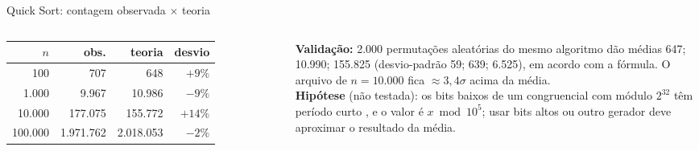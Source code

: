 \documentclass[aspectratio=169,10pt]{beamer}
\begin{document}
\begin{frame}{Quick Sort: contagem observada $\times$ teoria}
 \begin{columns}[T]
   \centering
   \footnotesize
   \begin{tabular}{@{}rrrr@{}}
    \toprule
    $n$ & obs. & teoria & desvio\\
    \midrule
    100 & 707 & 648 & $+9\%$\\
    1.000 & 9.967 & 10.986 & $-9\%$\\
    10.000 & 177.075 & 155.772 & $+14\%$\\
    100.000 & 1.971.762 & 2.018.053 & $-2\%$\\
    \bottomrule
   \end{tabular}
   \vspace{0.6em}\par
   \scriptsize
   \textbf{Validação:} 2.000 permutações aleatórias do mesmo algoritmo dão médias 647; 10.990; 155.825 (desvio-padrão 59; 639; 6.525), em acordo com a fórmula. O arquivo de $n=10.000$ fica $\approx3{,}4\sigma$ acima da média.\\[0.5ex]
   \textbf{Hipótese} (não testada): os bits baixos de um congruencial com módulo $2^{32}$ têm período curto \cite{knuth97}, e o valor é $x \bmod 10^5$; usar bits altos ou outro gerador deve aproximar o resultado da média.
 \end{columns}
\end{frame}
\end{document}
